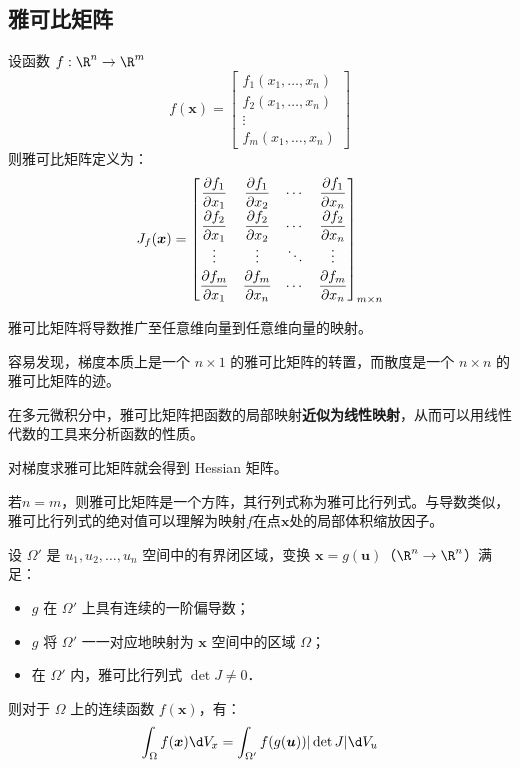 \documentclass[12pt, a4paper, oneside, UTF8]{ctexbook}
\begin{document}
\subsection{雅可比矩阵}
\begin{definition}[Jacobian 矩阵]
    设函数 $f:\R^n \to \R^m$
    \[f(\bm{x}) = \begin{bmatrix}
        f_1(x_1, \dots, x_n) \\
        f_2(x_1, \dots, x_n) \\
        \vdots \\
        f_m(x_1, \dots, x_n)
    \end{bmatrix}\]
    则雅可比矩阵定义为：
    \[ J_f(\bm{x}) = \begin{bmatrix}
        \displaystyle\pdv{f_1}{x_1} & \displaystyle\pdv{f_1}{x_2} & \cdots & \displaystyle\pdv{f_1}{x_n} \\[1.5ex]
        \displaystyle\pdv{f_2}{x_1} & \displaystyle\pdv{f_2}{x_2} & \cdots & \displaystyle\pdv{f_2}{x_n} \\[1.0ex]
        \vdots & \vdots & \ddots & \vdots \\[0.5ex]
        \displaystyle\pdv{f_m}{x_1} & \displaystyle\pdv{f_m}{x_n} & \cdots & \displaystyle\pdv{f_m}{x_n}
    \end{bmatrix}_{m \times n} \]
\end{definition}
\begin{myRemark}
    雅可比矩阵将导数推广至任意维向量到任意维向量的映射。

    容易发现，梯度本质上是一个 $n \times 1$ 的雅可比矩阵的转置，而散度是一个 $n \times n$ 的雅可比矩阵的迹。

    在多元微积分中，雅可比矩阵把函数的局部映射\textbf{近似为线性映射}，从而可以用线性代数的工具来分析函数的性质。

    对梯度求雅可比矩阵就会得到 Hessian 矩阵。

    若$n=m$，则雅可比矩阵是一个方阵，其行列式称为雅可比行列式。与导数类似，雅可比行列式的绝对值可以理解为映射$f$在点$\bm{x}$处的局部体积缩放因子。
\end{myRemark}
\begin{theorem}[变量替换定理]
    设 $\Omega'$ 是 $u_1, u_2, \dots, u_n$ 空间中的有界闭区域，变换 $\bm{x} = g(\bm{u})$（$\R^n\to\R^n$）满足：
    \begin{itemize}
        \item $g$ 在 $\Omega'$ 上具有连续的一阶偏导数；
        \item $g$ 将 $\Omega'$ 一一对应地映射为 $\bm{x}$ 空间中的区域 $\Omega$；
        \item 在 $\Omega'$ 内，雅可比行列式 $\det J\neq 0$．
    \end{itemize}
    则对于 $\Omega$ 上的连续函数 $f(\bm{x})$，有：
    \[ \int_{\Omega} f(\bm{x}) \d V_x = \int_{\Omega'} f(g(\bm{u})) |\det J| \d V_u \]
\end{theorem}
\end{document}
